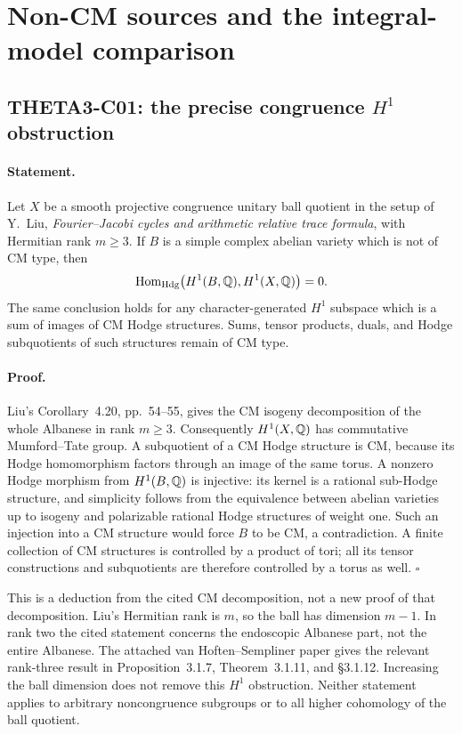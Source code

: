 \section{Non-CM sources and the integral-model comparison}

\subsection{THETA3-C01: the precise congruence $H^1$ obstruction}\label{C01}

\paragraph{Statement.}
Let $X$ be a smooth projective congruence unitary ball quotient in the
setup of Y.~Liu, \emph{Fourier--Jacobi cycles and arithmetic relative
trace formula}, with Hermitian rank $m\geq3$. If $B$ is a simple complex
abelian variety which is not of CM type, then
\[
 \operatorname{Hom}_{\mathrm{Hdg}}\bigl(H^1(B,\mathbb Q),H^1(X,\mathbb Q)\bigr)=0.
\]
The same conclusion holds for any character-generated $H^1$ subspace
which is a sum of images of CM Hodge structures. Sums, tensor products,
duals, and Hodge subquotients of such structures remain of CM type.

\paragraph{Proof.}
Liu's Corollary~4.20, pp.~54--55, gives the CM isogeny decomposition of
the whole Albanese in rank $m\geq3$. Consequently $H^1(X,\mathbb Q)$ has
commutative Mumford--Tate group. A subquotient of a CM Hodge structure
is CM, because its Hodge homomorphism factors through an image of the
same torus. A nonzero Hodge morphism from $H^1(B,\mathbb Q)$ is injective:
its kernel is a rational sub-Hodge structure, and simplicity follows
from the equivalence between abelian varieties up to isogeny and
polarizable rational Hodge structures of weight one. Such an
injection into a CM structure would force $B$ to be CM, a
contradiction. A finite collection of CM structures is controlled by
a product of tori; all its tensor constructions and subquotients are
therefore controlled by a torus as well. $\square$

This is a deduction from the cited CM decomposition, not a new proof
of that decomposition. Liu's Hermitian rank is $m$, so the ball has
dimension $m-1$. In rank two the cited statement concerns the
endoscopic Albanese part, not the entire Albanese. The attached
van Hoften--Sempliner paper gives the relevant rank-three result in
Proposition~3.1.7, Theorem~3.1.11, and \S3.1.12. Increasing the ball
dimension does not remove this $H^1$ obstruction. Neither statement
applies to arbitrary noncongruence subgroups or to all higher
cohomology of the ball quotient.

